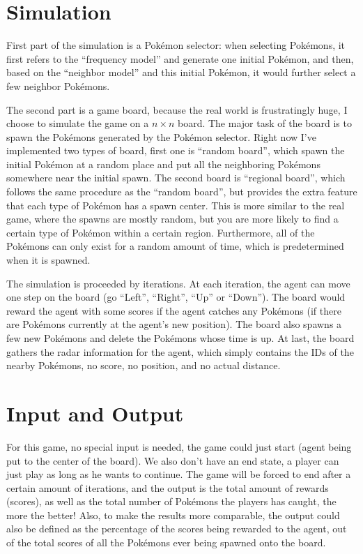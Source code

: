 \documentclass[12pt]{article}
\begin{document}
\section*{Simulation}
First part of the simulation 
is a Pok\'emon selector: when selecting Pok\'emons, it first 
refers to the ``frequency model'' and generate one initial Pok\'emon, and then,
based on the ``neighbor model'' and this initial Pok\'emon, it would further select a few neighbor Pok\'emons.
\par
The second part is a game board, because the real world is frustratingly huge, 
I choose to simulate the game on a $n \times n$ board.
The major task of the board is 
to spawn the Pok\'emons generated by the Pok\'emon selector. Right now
I've implemented two types of board, first one is ``random board'', which
spawn the initial Pok\'emon at a random place and put all the neighboring
Pok\'emons somewhere near the initial spawn. The second board is
``regional board'', which follows the same procedure as the ``random board'',
but provides the extra feature that each type of Pok\'emon has a spawn center.
This is more similar to the real game,
where the spawns are mostly random, but you
are more likely to find a certain type of Pok\'emon within a certain region.
Furthermore, all of the Pok\'emons can only exist for a random
amount of time, which is predetermined when it is spawned.

\par
The simulation is proceeded by iterations. At each iteration, the agent can
move one step on the board (go 
``Left'', ``Right'', ``Up'' or ``Down''). The board 
would reward the agent with some scores if 
the agent catches any Pok\'emons (if there are Pok\'emons currently at the
agent's new position). The board also spawns a few new Pok\'emons
and delete the Pok\'emons whose time is up. At last, the board 
gathers the radar information for the agent, which simply contains the
IDs of the 
nearby Pok\'emons, no score, no position, and no actual distance.


\section*{Input and Output}
For this game, no special input is needed, the game could
just start (agent being put to the center of the board). We also don't
have an end state, 
a player can just play as long as he wants to continue. 
The game will be forced
to end after a certain amount of iterations, and the 
output is the total amount of rewards (scores), 
as well as the total number of Pok\'emons
the players has caught, the more the better! Also, to make the results
more comparable, the output could also be defined as the percentage of the
scores being rewarded to the agent, out of the total scores of all the Pok\'emons ever being spawned onto the board.
\end{document}
